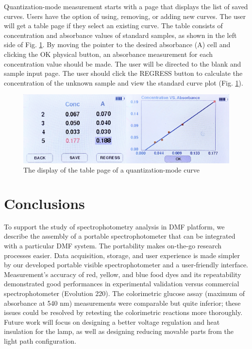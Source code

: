 \documentclass[conference]{IEEEtran}
\begin{document}
Quantization-mode measurement starts with a page that displays the list of saved curves.
Users have the option of using, removing, or adding new curves.
The user will get a table page if they select an existing curve.
The table consists of concentration and absorbance values of standard samples, as shown in the left side of Fig. \ref{lcd-conc}.
By moving the pointer to the desired absorbance (A) cell and clicking the OK physical button, an absorbance measurement for each concentration value should be made.
The user will be directed to the blank and sample input page.
The user should click the REGRESS button to calculate the concentration of the unknown sample and view the standard curve plot (Fig. \ref{lcd-conc}).

    \begin{figure}[htbp]
    \centerline{\includegraphics[scale=0.06]{lcd-conc.jpeg}}
    \caption{The display of the table page of a quantization-mode curve}
    \label{lcd-conc}
    \end{figure}

\section{Conclusions}
To support the study of spectrophotometry analysis in DMF platform, we describe the assembly of a portable spectrophotometer that can be integrated with a particular DMF system.
The portability makes on-the-go research processes easier.
Data acquisition, storage, and user experience is made simpler by our developed portable visible spectrophotometer and a user-friendly interface.
Measurement's accuracy of red, yellow, and blue food dyes and its repeatability demonstrated good performances in experimental validation versus commercial spectrophotometer (Evolution 220).
The colorimetric glucose assay (maximum of absorbance at 540 nm) measurements were comparable but quite inferior; these issues could be resolved by retesting the colorimetric reactions more thoroughly.
Future work will focus on designing a better voltage regulation and heat insulation for the lamp, as well as designing reducing movable parts from the light path configuration.
\end{document}
